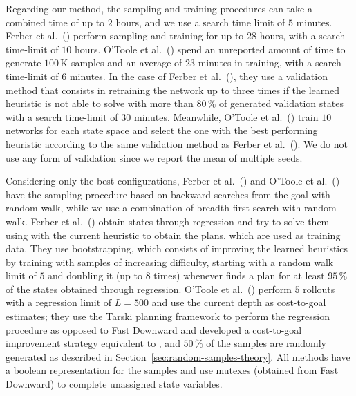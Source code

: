 Regarding our method, the sampling and training procedures can take a combined time of up to $2$ hours, and we use a search time limit of $5$ minutes. Ferber et al.~(\citeyear{Ferber.etal/2022}) perform sampling and training for up to $28$ hours, with a search time-limit of $10$ hours. O'Toole et al.~(\citeyear{OToole/2022}) spend an unreported amount of time to generate $100$\,K samples and an average of $23$ minutes in training, with a search time-limit of $6$ minutes. In the case of Ferber et al.~(\citeyear{Ferber.etal/2022}), they use a validation method that consists in retraining the network up to three times if the learned heuristic is not able to solve with \gbfs more than $80\,\%$ of generated validation states with a search time-limit of $30$ minutes. Meanwhile, O'Toole et al.~(\citeyear{OToole/2022}) train $10$ networks for each state space and select the one with the best performing heuristic according to the same validation method as Ferber et al.~(\citeyear{Ferber.etal/2022}). We do not use any form of validation since we report the mean of multiple seeds.

Considering only the best configurations, Ferber et al.~(\citeyear{Ferber.etal/2022}) and O'Toole et al.~(\citeyear{OToole/2022}) have the sampling procedure based on backward searches from the goal with random walk, while we use a combination of breadth-first search with random walk. Ferber et al.~(\citeyear{Ferber.etal/2022}) obtain states through regression and try to solve them using \gbfs with the current heuristic to obtain the plans, which are used as training data. They use bootstrapping, which consists of improving the learned heuristics by training with samples of increasing difficulty, starting with a random walk limit of $5$ and doubling it (up to $8$ times) whenever \gbfs finds a plan for at least $95\,\%$ of the states obtained through regression. O'Toole et al.~(\citeyear{OToole/2022}) perform $5$ rollouts with a regression limit of $L=500$ and use the current depth as cost-to-goal estimates; they use the Tarski planning framework to perform the regression procedure as opposed to Fast Downward and developed a cost-to-goal improvement strategy equivalent to \hmin, and $50\,\%$ of the samples are randomly generated as described in Section~\ref{sec:random-samples-theory}. All methods have a boolean representation for the samples and use mutexes (obtained from Fast Downward) to complete unassigned state variables.

